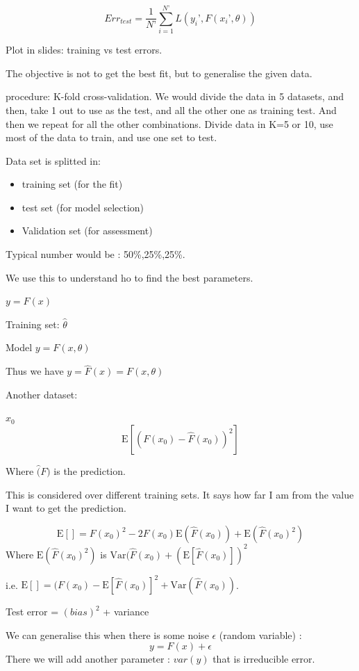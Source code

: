\documentclass[a4paper]{tufte-book}
\newcommand{\E}{\mathrm{E}}
\newcommand{\var}{\mathrm{Var}}
\begin{document}
\begin{equation}
Err_{test} = \frac{1}{N’} \sum_{i=1}^{N’} L(y_i’,F(x_i’,\theta))
\end{equation}

Plot in slides: training vs test errors.

The objective is not to get the best fit, but to generalise the given data.

procedure: K-fold cross-validation. 
We would divide the data in 5 datasets, and then, take 1 out to use as the test, and all the other one as training test. 
And then we repeat for all the other combinations. Divide data in K=5 or 10, use most of the data to train, and use one set to test.

Data set is splitted in:
\begin{itemize}
\item training set (for the fit)
\item test set (for model selection)
\item Validation set (for assessment)
\end{itemize}

Typical number would be : 50\%,25\%,25\%.

We use this to understand ho to find the best parameters.

$y=F(x)$

Training set: $\hat{\theta}$

Model $y=F(x,\theta)$

Thus we have $y= \hat{F}(x) = F(x,\theta)$

Another dataset:

$x_0$
\begin{equation}
\E [(F(x_0) - \hat{F}(x_0) )^2]
\end{equation}

Where $\hat(F)$ is the prediction.

This is considered over different training sets. It says how far I am from the value I want to get the prediction.

\begin{equation}
\E[] = F(x_0)^2 - 2F(x_0) \E (\hat{F}(x_0)) + \E (\hat{F}(x_0)^2)
\end{equation}
Where $\E (\hat{F}(x_0)^2)$ is $\var(\hat{F}(x_0) + (\E[\hat{F}(x_0)])^2$

i.e. $\E[] = (F(x_0) - \E[\hat{F}(x_0)]^2 + \var(\hat{F}(x_0))$.

Test error = $(bias)^2$ + variance

We can generalise this when there is some noise $\epsilon$ (random variable) :
\begin{equation}
y = F(x) + \epsilon
\end{equation} 
There we will add another parameter : $var(y)$ that is irreducible error.
\end{document}
